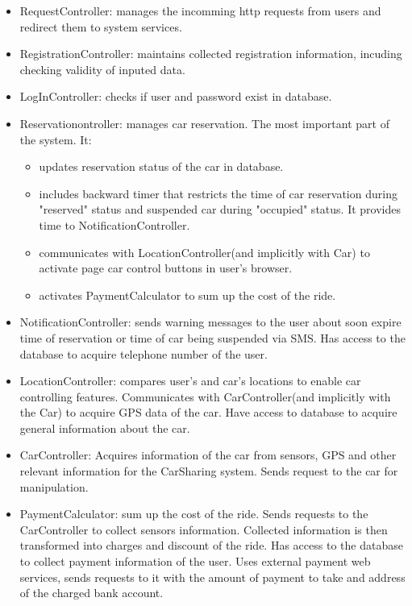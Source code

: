 \documentclass[12pt, letterpaper]{article}
\begin{document}
\begin{itemize}
	\item RequestController: manages the incomming http requests from users and redirect them to system services.
	\item RegistrationController: maintains collected registration information, incuding checking validity of inputed data. 
	\item LogInController: checks if user and password exist in database. 
	\item Reservationontroller: manages car reservation. The most important part of the system. It: 
	\begin{itemize}
	   	\item updates reservation status of the car in database.
	   	\item includes backward timer that restricts the time of car reservation during "reserved" status and suspended car during "occupied" status. It provides time to NotificationController.  
	   	\item communicates with LocationController(and implicitly with Car) to activate page car control buttons in user's browser.
	   	\item activates PaymentCalculator to sum up the cost of the ride. 
	\end{itemize}   
	\item NotificationController: sends warning messages to the user about soon expire time of reservation or time of car being suspended via SMS. Has access to the database to acquire telephone number of the user.
	\item LocationController: compares user's and car's locations to enable car controlling features. Communicates with CarController(and implicitly with the Car) to acquire GPS data of the car. Have access to database to acquire general information about the car.  
	\item CarController: Acquires information of the car from sensors, GPS and other relevant information for the CarSharing system. Sends request to the car for manipulation. 
	\item PaymentCalculator: sum up the cost of the ride. Sends requests to the CarController to collect sensors information. Collected information is then transformed into charges and discount of the ride. Has access to the database to collect payment information of the user. Uses external payment web services, sends requests to it with the amount of payment to take and address of the charged bank account. 
\end{itemize}
\end{document}

